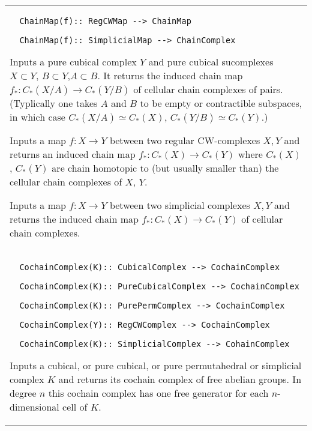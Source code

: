 \documentclass[a4paper,11pt]{report}
\begin{document}
{\begin{center}
\begin{tabular}{|l|}
\begin{verbatim}  ChainMap(f):: RegCWMap --> ChainMap
\end{verbatim}
 
\begin{verbatim}  ChainMap(f):: SimplicialMap --> ChainComplex
\end{verbatim}


 

Inputs a pure cubical complex $Y$ and pure cubical sucomplexes $X\subset Y$, $B\subset Y$,$A\subset B$. It returns the induced chain map $f_\ast\colon C_\ast(X/A) \rightarrow C_\ast(Y/B)$ of cellular chain complexes of pairs. (Typlically one takes $A$ and $B$ to be empty or contractible subspaces, in which case $C_\ast(X/A) \simeq C_\ast(X)$, $C_\ast(Y/B) \simeq C_\ast(Y)$.) 

 Inputs a map $f\colon X \rightarrow Y$ between two regular CW-complexes $X,Y$ and returns an induced chain map $f_\ast\colon C_\ast(X) \rightarrow C_\ast(Y)$ where $C_\ast(X)$, $C_\ast(Y)$ are chain homotopic to (but usually smaller than) the cellular chain complexes
of $X$, $Y$. 

 Inputs a map $f\colon X \rightarrow Y$ between two simplicial complexes $X,Y$ and returns the induced chain map $f_\ast\colon C_\ast(X) \rightarrow C_\ast(Y)$ of cellular chain complexes. \\
 \index{CochainComplex} 
\begin{verbatim}  CochainComplex(K):: CubicalComplex --> CochainComplex
\end{verbatim}
 
\begin{verbatim}  CochainComplex(K):: PureCubicalComplex --> CochainComplex
\end{verbatim}
 
\begin{verbatim}  CochainComplex(K):: PurePermComplex --> CochainComplex
\end{verbatim}
 
\begin{verbatim}  CochainComplex(Y):: RegCWComplex --> CochainComplex
\end{verbatim}
 
\begin{verbatim}  CochainComplex(K):: SimplicialComplex --> CohainComplex
\end{verbatim}


 

 Inputs a cubical, or pure cubical, or pure permutahedral or simplicial complex $K$ and returns its cochain complex of free abelian groups. In degree $n$ this cochain complex has one free generator for each $n$-dimensional cell of $K$. 


\end{tabular}
\end{center}}
\end{document}
